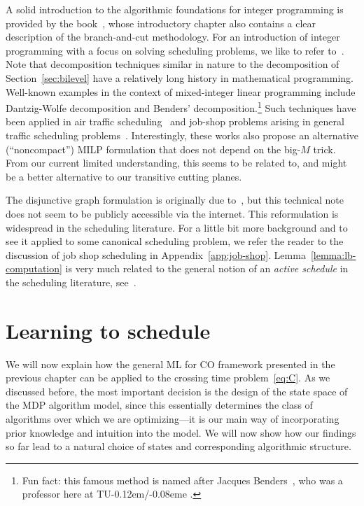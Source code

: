 \documentclass[a4paper]{report}
\theoremstyle{definition}
\theoremstyle{plain}
\newcommand{\TUE}{TU\kern-0.12em/\kern-0.08eme }
\begin{document}
A solid introduction to the algorithmic foundations for integer programming is
provided by the book~\cite{confortiIntegerProgramming2014}, whose introductory chapter also contains a clear
description of the branch-and-cut methodology. For an introduction of integer
programming with a focus on solving scheduling problems, we like to refer
to~\cite[Appendix A]{pinedoSchedulingTheoryAlgorithms2016}.
%
Note that decomposition techniques similar in nature to the decomposition of
Section~\ref{sec:bilevel} have a relatively long history in mathematical programming.
Well-known examples in the context of mixed-integer linear programming include
Dantzig-Wolfe decomposition and Benders' decomposition.\footnote{Fun fact: this
  famous method is named after Jacques
  Benders~\cite{aardalJacquesBendersHis2025}, who was a professor here at \TUE.}
%
Such techniques have been applied in air traffic scheduling~\cite{manninoPathCycleFormulation2018} and job-shop
problems arising in general traffic scheduling problems~\cite{lamorgeseNoncompactFormulationJobShop2019}.
%
Interestingly, these works also propose an alternative (``noncompact'') MILP
formulation that does not depend on the big-$M$ trick. From our current limited
understanding, this seems to be related to, and might be a better alternative to
our transitive cutting planes.

The disjunctive graph formulation is originally due
to~\cite{roy1964disjunctive}, but this technical note does not seem to be
publicly accessible via the internet.
%
This reformulation is widespread in the scheduling literature. For a little bit
more background and to see it applied to some canonical scheduling problem, we
refer the reader to the discussion of job shop scheduling in
Appendix~\ref{app:job-shop}.
%
Lemma~\ref{lemma:lb-computation} is very much related to the general notion of
an \emph{active schedule} in the scheduling literature, see~\cite[Definition
2.3.3]{pinedoSchedulingTheoryAlgorithms2016}.



\chapter{Learning to schedule}\label{chap:single-learning}

We will now explain how the general ML for CO framework presented in the
previous chapter can be applied to the crossing time problem~\eqref{eq:C}.
%
As we discussed before, the most important decision is the design of the state
space of the MDP algorithm model, since this essentially determines the class of
algorithms over which we are optimizing---it is our main way of incorporating
prior knowledge and intuition into the model.
%
We will now show how our findings so far lead
to a natural choice of states and corresponding algorithmic structure.
\end{document}
